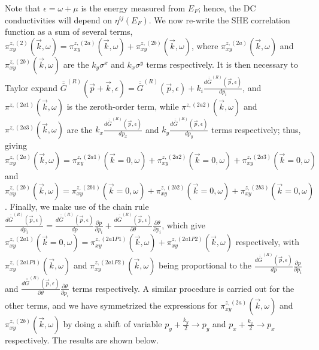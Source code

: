 \documentclass[letter,12pt,preprint,aps]{revtex4-1}
\newcommand{\Gbar}{\overline{\overline{G}}}
\begin{document}
Note that $\epsilon = \omega + \mu$ is the energy measured from $E_F$; hence, the DC conductivities will depend on $\eta^{ij}(E_F)$. We now re-write the SHE correlation function as a sum of several terms, $\pi^{z,(2)}_{xy}(\vec{k}, \omega) = \pi^{z,(2a)}_{xy}(\vec{k}, \omega)  + \pi^{z,(2b)}_{xy}(\vec{k}, \omega)$, where $\pi^{z,(2a)}_{xy}(\vec{k}, \omega)$ and $\pi^{z,(2b)}_{xy}(\vec{k}, \omega)$ are the $k_y \sigma^x$ and $k_x \sigma^y$ terms respectively. It is then necessary to Taylor expand $\Gbar^{(R)}(\vec{p} + \vec{k}, \epsilon) = \Gbar^{(R)}(\vec{p}, \epsilon) + k_i \tfrac{d \Gbar^{(R)}(\vec{p}, \epsilon)}{d p_i}$, and $\pi^{z, (2a1)}(\vec{k}, \omega)$ is the zeroth-order term, while $\pi^{z, (2a2)}(\vec{k}, \omega)$ and $\pi^{z, (2a3)}(\vec{k}, \omega)$ are the $k_x \tfrac{d \Gbar^{(R)}(\vec{p}, \epsilon)}{d p_x}$ and $k_y \tfrac{d \Gbar^{(R)}(\vec{p}, \epsilon)}{d p_y}$ terms respectively; thus, giving  $\pi^{z,(2a)}_{xy}(\vec{k}, \omega) = \pi^{z,(2a1)}_{xy}(\vec{k} = 0, \omega) + \pi^{z,(2a2)}_{xy}(\vec{k} = 0, \omega) + \pi^{z,(2a3)}_{xy}(\vec{k} = 0, \omega)$ and $\pi^{z,(2b)}_{xy}(\vec{k}, \omega) = \pi^{z,(2b1)}_{xy}(\vec{k} = 0, \omega) + \pi^{z,(2b2)}_{xy}(\vec{k} = 0, \omega) + \pi^{z,(2b3)}_{xy}(\vec{k} = 0, \omega)$. Finally, we make use of the chain rule $\tfrac{d \Gbar^{(R)}(\vec{p}, \epsilon)}{d p_i} = \tfrac{d \Gbar^{(R)}(\vec{p}, \epsilon)}{d p} \tfrac{\partial p}{ \partial p_i} + \tfrac{d \Gbar^{(R)}(\vec{p}, \epsilon)}{\partial \theta} \tfrac{\partial \theta}{ \partial p_i}$, which give $\pi^{z,(2a1)}_{xy}(\vec{k} = 0, \omega) = \pi^{z,(2a1P1)}_{xy}(\vec{k}, \omega) + \pi^{z,(2a1P2)}_{xy}(\vec{k}, \omega)$ respectively, with $\pi^{z,(2a1P1)}_{xy}(\vec{k}, \omega)$ and $\pi^{z,(2a1P2)}_{xy}(\vec{k}, \omega)$ being proportional to the $\tfrac{d \Gbar^{(R)}(\vec{p}, \epsilon)}{d p} \tfrac{\partial p}{ \partial p_i}$ and $\tfrac{d \Gbar^{(R)}(\vec{p}, \epsilon)}{\partial \theta} \tfrac{\partial \theta}{ \partial p_i}$ terms respectively. A similar procedure is carried out for the other terms, and we have symmetrized the expressions for $\pi^{z, (2a)}_{xy}(\vec{k}, \omega)$ and $\pi^{z, (2b)}_{xy}(\vec{k}, \omega)$ by doing a shift of variable $p_y + \tfrac{k_y}{2} \rightarrow p_y$ and $p_x + \tfrac{k_x}{2} \rightarrow p_x$ respectively. The results are shown below.
%
\end{document}
